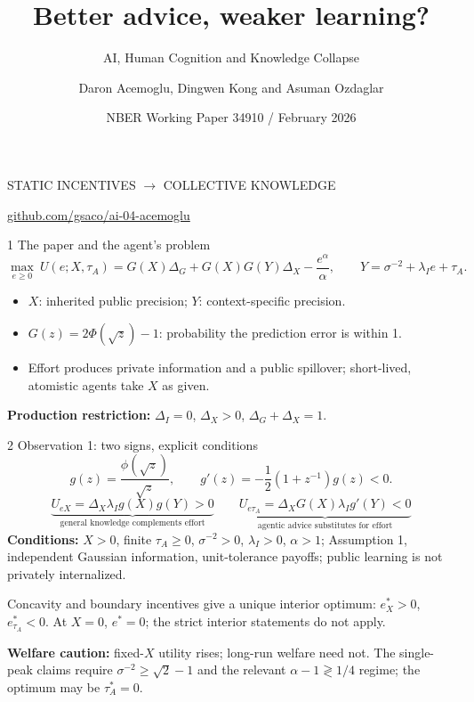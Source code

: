 \documentclass[11pt,aspectratio=169]{beamer}
\title{Better advice, weaker learning?}
\subtitle{AI, Human Cognition and Knowledge Collapse}
\author{Daron Acemoglu, Dingwen Kong and Asuman Ozdaglar}
\date{NBER Working Paper 34910 \enspace / \enspace February 2026}
\begin{document}
\begin{frame}
\vspace{5mm}
{\color{Accent}\small STATIC INCENTIVES $\longrightarrow$ COLLECTIVE KNOWLEDGE}\par\bigskip
{\inserttitle}\par\medskip
{\large\insertsubtitle}\par\bigskip
\insertauthor\par\smallskip
{\small\color{Muted}\insertdate}\par\bigskip
\href{https://github.com/gsaco/ai-04-acemoglu}{\textcolor{Accent}{github.com/gsaco/ai-04-acemoglu}}
\end{frame}

\begin{frame}{1 \enspace The paper and the agent's problem}
\[
\max_{e\geq0}\ U(e;X,\tau_A)
=G(X)\Delta_G+G(X)G(Y)\Delta_X-\frac{e^\alpha}{\alpha},
\qquad Y=\sigma^{-2}+\lambda_I e+\tau_A.
\]
\begin{itemize}\setlength\itemsep{2mm}
\item $X$: inherited public precision; $Y$: context-specific precision.
\item $G(z)=2\Phi(\sqrt z)-1$: probability the prediction error is within 1.
\item Effort produces private information and a public spillover; short-lived,
atomistic agents take $X$ as given.
\end{itemize}
\medskip
\textbf{Production restriction:} $\Delta_I=0$, $\Delta_X>0$, $\Delta_G+\Delta_X=1$.
\end{frame}

\begin{frame}{2 \enspace Observation 1: two signs, explicit conditions}
\[
g(z)=\frac{\phi(\sqrt z)}{\sqrt z},\qquad
 g'(z)=-\frac12(1+z^{-1})g(z)<0.
\]
\[
\underbrace{U_{eX}=\Delta_X\lambda_I g(X)g(Y)>0}_{\text{general knowledge complements effort}}
\qquad
\underbrace{U_{e\tau_A}=\Delta_XG(X)\lambda_I g'(Y)<0}_{\text{agentic advice substitutes for effort}}
\]
\small
\textbf{Conditions:} $X>0$, finite $\tau_A\geq0$, $\sigma^{-2}>0$, $\lambda_I>0$,
$\alpha>1$; Assumption 1, independent Gaussian information, unit-tolerance payoffs;
public learning is not privately internalized.
\medskip

Concavity and boundary incentives give a unique interior optimum: $e_X^*>0$, $e_{\tau_A}^*<0$.
At $X=0$, $e^*=0$; the strict interior statements do not apply.
\medskip

\textbf{Welfare caution:} fixed-$X$ utility rises; long-run welfare need not.
The single-peak claims require $\sigma^{-2}\geq\sqrt2-1$ and the relevant
$\alpha-1\gtrless1/4$ regime; the optimum may be $\tau_A^*=0$.
\end{frame}
\end{document}
